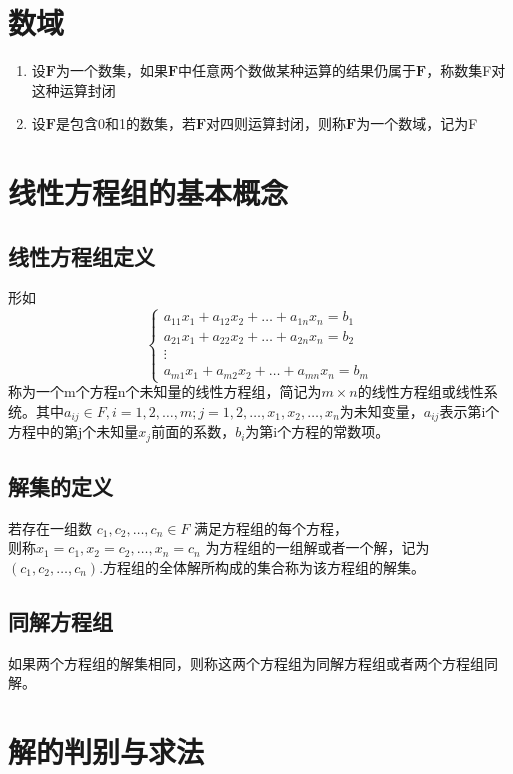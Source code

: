 \documentclass[a4paper]{ctexbook}
\begin{document}
\chapter{数域}
\begin{enumerate}
    \item 设\(\mathbf{F}\)为一个数集，如果\(\mathbf{F}\)中任意两个数做某种运算的结果仍属于\(\mathbf{F}\)，称数集F对这种运算封闭
    \item 设\(\mathbf{F}\)是包含0和1的数集，若\(\mathbf{F}\)对四则运算封闭，则称\(\mathbf{F}\)为一个数域，记为F
\end{enumerate}
\chapter{线性方程组的基本概念}
\section{线性方程组定义}
形如
\[\begin{cases}
    a_{11}x_1 + a_{12}x_2 + \dots + a_{1n}x_n = b_1\\
    a_{21}x_1 + a_{22}x_2 + \dots + a_{2n}x_n = b_2\\
    \vdots \\
    a_{m1}x_1 + a_{m2}x_2 + \dots + a_{mn}x_n = b_m
\end{cases}
\]
称为一个m个方程n个未知量的线性方程组，简记为\(m \times n\)的线性方程组或线性系统。其中\(a_{ij} \in F, i=1,2,\dots ,m; j=1,2,\dots,  x_1 , x_2 , \dots , x_n\)为未知变量，\(a_{ij}\)表示第i个方程中的第j个未知量\(x_j\)前面的系数，\(b_i\)为第i个方程的常数项。

\section{解集的定义}
若存在一组数 \(c_1,c_2,\dots ,c_n \in F\) 满足方程组的每个方程，\\则称\(x_1=c_1,x_2=c_2,\dots ,x_n=c_n\) 为方程组的一组解或者一个解，记为\((c_1,c_2,\dots ,c_n)\).方程组的全体解所构成的集合称为该方程组的解集。

\section{同解方程组}
如果两个方程组的解集相同，则称这两个方程组为同解方程组或者两个方程组同解。

\chapter{解的判别与求法}
\end{document}
